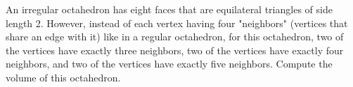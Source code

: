 An irregular octahedron has eight faces that are equilateral triangles of side length 2. However, instead of each vertex having four "neighbors" (vertices that share an edge with it) like in a regular octahedron, for this octahedron, two of the vertices have exactly three neighbors, two of the vertices have exactly four neighbors, and two of the vertices have exactly five neighbors. Compute the volume of this octahedron.